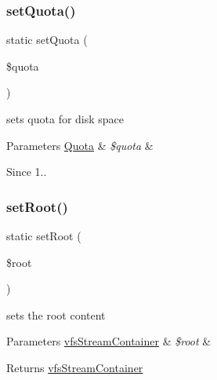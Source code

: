 \subsubsection{\texorpdfstring{set\+Quota()}{setQuota()}}
{\footnotesize\ttfamily static set\+Quota (\begin{DoxyParamCaption}\item[{\mbox{\hyperlink{classorg_1_1bovigo_1_1vfs_1_1_quota}{Quota}}}]{\$quota }\end{DoxyParamCaption})\hspace{0.3cm}{\ttfamily [static]}}

sets quota for disk space


\begin{DoxyParams}[1]{Parameters}
\mbox{\hyperlink{classorg_1_1bovigo_1_1vfs_1_1_quota}{Quota}} & {\em \$quota} & \\
\hline
\end{DoxyParams}
\begin{DoxySince}{Since}
1.. 
\end{DoxySince}
\mbox{\label{classorg_1_1bovigo_1_1vfs_1_1vfs_stream_wrapper_a9e895af9df4006a20d6dcbe4747398a2}} 
\subsubsection{\texorpdfstring{set\+Root()}{setRoot()}}
{\footnotesize\ttfamily static set\+Root (\begin{DoxyParamCaption}\item[{\mbox{\hyperlink{interfaceorg_1_1bovigo_1_1vfs_1_1vfs_stream_container}{vfs\+Stream\+Container}}}]{\$root }\end{DoxyParamCaption})\hspace{0.3cm}{\ttfamily [static]}}

sets the root content


\begin{DoxyParams}[1]{Parameters}
\mbox{\hyperlink{interfaceorg_1_1bovigo_1_1vfs_1_1vfs_stream_container}{vfs\+Stream\+Container}} & {\em \$root} & \\
\hline
\end{DoxyParams}
\begin{DoxyReturn}{Returns}
\mbox{\hyperlink{interfaceorg_1_1bovigo_1_1vfs_1_1vfs_stream_container}{vfs\+Stream\+Container}} 
\end{DoxyReturn}
\mbox{\label{classorg_1_1bovigo_1_1vfs_1_1vfs_stream_wrapper_a9ccf585d937023486b26731ad1849a6f}} 
